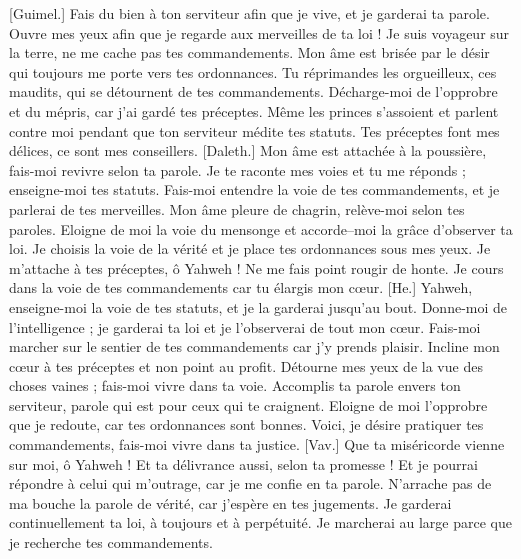 \begin{multicols}{2}
[Guimel.] Fais du bien à ton serviteur afin que je vive, et je garderai ta parole.
Ouvre mes yeux afin que je regarde aux merveilles de ta loi !
Je suis voyageur sur la terre, ne me cache pas tes commandements.
Mon âme est brisée par le désir qui toujours me porte vers tes ordonnances.
Tu réprimandes les orgueilleux, ces maudits, qui se détournent de tes commandements.
Décharge-moi de l'opprobre et du mépris, car j'ai gardé tes préceptes.
Même les princes s'assoient et parlent contre moi pendant que ton serviteur médite tes statuts.
Tes préceptes font mes délices, ce sont mes conseillers.
[Daleth.] Mon âme est attachée à la poussière, fais-moi revivre selon ta parole.
Je te raconte mes voies et tu me réponds ; enseigne-moi tes statuts.
Fais-moi entendre la voie de tes commandements, et je parlerai de tes merveilles.
Mon âme pleure de chagrin, relève-moi selon tes paroles.
Eloigne de moi la voie du mensonge et accorde–moi la grâce d'observer ta loi.
Je choisis la voie de la vérité et je place tes ordonnances sous mes yeux.
Je m'attache à tes préceptes, ô Yahweh ! Ne me fais point rougir de honte.
Je cours dans la voie de tes commandements car tu élargis mon cœur.
[He.] Yahweh, enseigne-moi la voie de tes statuts, et je la garderai jusqu'au bout.
Donne-moi de l'intelligence ; je garderai ta loi et je l'observerai de tout mon cœur.
Fais-moi marcher sur le sentier de tes commandements car j'y prends plaisir.
Incline mon cœur à tes préceptes et non point au profit.
Détourne mes yeux de la vue des choses vaines ; fais-moi vivre dans ta voie.
Accomplis ta parole envers ton serviteur, parole qui est pour ceux qui te craignent.
Eloigne de moi l'opprobre que je redoute, car tes ordonnances sont bonnes.
Voici, je désire pratiquer tes commandements, fais-moi vivre dans ta justice.
[Vav.] Que ta miséricorde vienne sur moi, ô Yahweh ! Et ta délivrance aussi, selon ta promesse !
Et je pourrai répondre à celui qui m'outrage, car je me confie en ta parole.
N'arrache pas de ma bouche la parole de vérité, car j'espère en tes jugements.
Je garderai continuellement ta loi, à toujours et à perpétuité.
Je marcherai au large parce que je recherche tes commandements.

\end{multicols}
